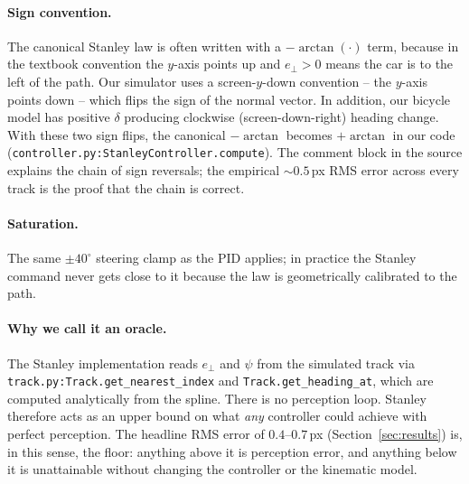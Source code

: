 \paragraph{Sign convention.}
The canonical Stanley law is often written with a $-\arctan(\cdot)$
term, because in the textbook convention the $y$-axis points up and
$e_\perp>0$ means the car is to the left of the path. Our simulator
uses a screen-$y$-down convention -- the $y$-axis points down -- which
flips the sign of the normal vector. In addition, our bicycle model
has positive $\delta$ producing clockwise (screen-down-right) heading
change. With these two sign flips, the canonical $-\arctan$ becomes
$+\arctan$ in our code
(\texttt{controller.py:StanleyController.compute}). The comment block
in the source explains the chain of sign reversals; the empirical
$\sim 0.5$\,px RMS error across every track is the proof that the
chain is correct.

\paragraph{Saturation.}
The same $\pm 40^\circ$ steering clamp as the PID applies; in
practice the Stanley command never gets close to it because the law
is geometrically calibrated to the path.

\paragraph{Why we call it an oracle.}
The Stanley implementation reads $e_\perp$ and $\psi$ from the
simulated track via \texttt{track.py:Track.get\_nearest\_index} and
\texttt{Track.get\_heading\_at}, which are computed analytically from
the spline. There is no perception loop. Stanley therefore acts as an
upper bound on what \emph{any} controller could achieve with perfect
perception. The headline RMS error of $0.4$--$0.7$\,px
(Section~\ref{sec:results}) is, in this sense, the floor: anything
above it is perception error, and anything below it is unattainable
without changing the controller or the kinematic model.

